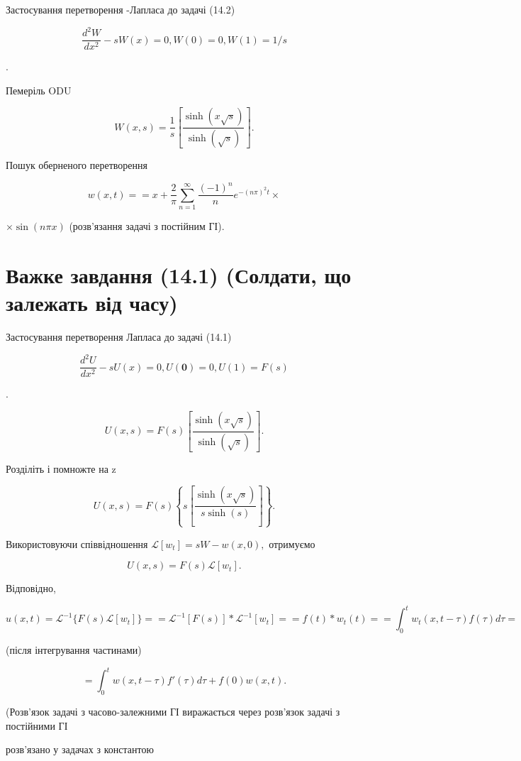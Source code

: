 \documentclass[
  ukrainian,
]{article}
\begin{document}
Застосування перетворення -Лапласа до задачі (14.2)

\[
\frac{d^2W}{dx^2} - sW(x) = 0,
W(0) = 0,
W(1) = 1/s
\]

.

Пемеріль ODU

\[
W(x, s) = \frac{1}{s} \left[ \frac{\sinh(x \sqrt{s})}{\sinh(\sqrt{s})} \right].
\]

Пошук оберненого перетворення

\[
w(x, t) =
= x + \frac{2}{\pi} \sum_{n=1}^{\infty} \frac{(-1)^n}{n} e^{-(n\pi)^2 t} \times
\]

\(\times \sin(n\pi x)\) (розв'язання задачі з постійним ГІ).

\section{Важке завдання (14.1) (Солдати, що залежать від
часу)}\label{ux432ux430ux436ux43aux435-ux437ux430ux432ux434ux430ux43dux43dux44f-14.1-ux441ux43eux43bux434ux430ux442ux438-ux449ux43e-ux437ux430ux43bux435ux436ux430ux442ux44c-ux432ux456ux434-ux447ux430ux441ux443}

Застосування перетворення Лапласа до задачі (14.1)

\[
\frac{d^2U}{dx^2} - sU(x) = 0,
U\left( \mathbf{0}\right) =0,
U(1) = F(s)
\]

.

\[
U(x, s) = F(s) \left[ \frac{\sinh(x \sqrt{s})}{\sinh(\sqrt{s})} \right].
\]

Розділіть і помножте на z

\[
U(x, s) = F(s) \left\{ s \left[ \frac{\sinh(x \sqrt{s})}{s \sinh(s)} \right] \right\}.
\]

Використовуючи співвідношення \(\mathscr{L}[w_t] = sW - w(x, 0),\)
отримуємо

\[
U(x, s) = F(s) \mathcal{L}[w_t].
\]

Відповідно,

\[
u(x, t) = \mathcal{L}^{-1} \{ F(s) \mathcal{L}[w_t] \} =
= \mathcal{L}^{-1} [ F(s) ] * \mathcal{L}^{-1}[w_t] =
= f(t) * w_t(t) =
= \int_0^t w_t(x, t-\tau) f(\tau) d\tau =
\]

(після інтегрування частинами)

\[
= \int_{0}^{t} w(x, t-\tau) f'(\tau) d\tau + f(0) w(x, t).
\]

(Розв'язок задачі з часово-залежними ГІ виражається через розв'язок
задачі з постійними ГІ

розв'язано у задачах з константою
\end{document}
